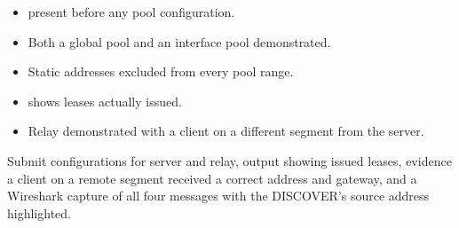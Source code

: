 \begin{verifybox}
\begin{itemize}
  \item {} present before any pool configuration.
  \item Both a global pool and an interface pool demonstrated.
  \item Static addresses excluded from every pool range.
  \item {} shows leases actually issued.
  \item Relay demonstrated with a client on a different segment from the server.
\end{itemize}
\end{verifybox}

\begin{labdeliverable}
Submit configurations for server and relay,  output showing issued leases, evidence a client on a remote segment received a correct address and gateway, and a Wireshark capture of all four messages with the DISCOVER's source address highlighted.
\end{labdeliverable}
